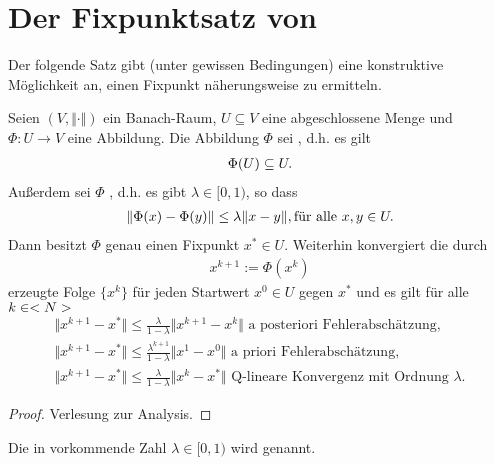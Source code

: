 \section{Der Fixpunktsatz von }

Der folgende Satz gibt (unter gewissen Bedingungen) eine konstruktive Möglichkeit an, einen Fixpunkt näherungsweise zu ermitteln.

\begin{proposition}[Banach]
	Seien $(V, \Vert \cdot \Vert)$ ein Banach-Raum, $U \subseteq V$ eine abgeschlossene Menge und $\Phi: U \to V$ eine Abbildung. Die Abbildung $\Phi$ sei , d.h. es gilt
	\begin{align}
	\Phi(U) \subseteq U.\notag
	\end{align}
	Außerdem sei $\Phi$ , d.h. es gibt $\lambda \in [0,1)$, so dass
	\begin{align}
	\Vert\Phi(x) - \Phi(y)\Vert \le \lambda \Vert x-y\Vert, \text{für alle } x,y \in U.\notag
	\end{align}
	Dann besitzt $\Phi$ genau einen Fixpunkt $x^{*} \in U$. Weiterhin konvergiert die durch
	\begin{align}
	x^{k+1} := \Phi(x^k) \label{eq_1_1_1}
	\end{align}
	erzeugte Folge $\{x^k\}$ für jeden Startwert $x^0 \in U$ gegen $x^{*}$ und es gilt für alle $k \in <N>$
	\begin{align}
	\Vert x^{k+1} - x^{*}\Vert \le \frac{\lambda}{1 - \lambda}\Vert x^{k+1} - x^k\Vert \text{ a posteriori Fehlerabschätzung},\\
	\Vert x^{k+1} - x^{*}\Vert \le \frac{\lambda^{k+1}}{1 - \lambda}\Vert x^1 - x^0\Vert \text{ a priori Fehlerabschätzung},\\
	\Vert x^{k+1} - x^{*}\Vert \le \frac{\lambda}{1 - \lambda}\Vert x^{k} - x^{*}\Vert \text{ Q-lineare Konvergenz mit Ordnung }\lambda.
	\end{align}
\end{proposition}

\begin{proof}
	Verlesung zur Analysis.
\end{proof}

Die in  vorkommende Zahl $\lambda \in [0,1)$ wird  genannt. 